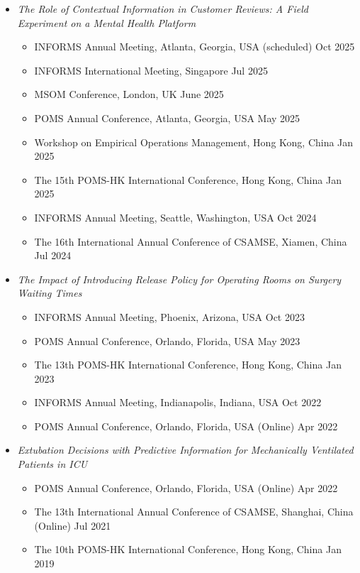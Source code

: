 \documentclass[12pt, a4paper]{article}
\begin{document}
{\begin{itemize}
	\item[] {\it The Role of Contextual Information in Customer Reviews: A Field Experiment on a Mental Health Platform}
	\begin{itemize}
		\item INFORMS Annual Meeting, Atlanta, Georgia, USA (scheduled) \hfill Oct 2025
		\item INFORMS International Meeting, Singapore \hfill Jul 2025
		\item MSOM Conference, London, UK \hfill June 2025
		\item POMS Annual Conference, Atlanta, Georgia, USA \hfill May 2025
		\item Workshop on Empirical Operations Management, Hong Kong, China \hfill Jan 2025
		\item The 15th POMS-HK International Conference, Hong Kong, China \hfill Jan 2025
		\item INFORMS Annual Meeting, Seattle, Washington, USA \hfill Oct 2024
		\item The 16th International Annual Conference of CSAMSE, Xiamen, China \hfill Jul 2024
	\end{itemize}

	\item[] {\it The Impact of Introducing Release Policy for Operating Rooms on Surgery Waiting Times}
	\begin{itemize}
		\item INFORMS Annual Meeting, Phoenix, Arizona, USA \hfill Oct 2023
		\item POMS Annual Conference, Orlando, Florida, USA \hfill May 2023
		\item The 13th POMS-HK International Conference, Hong Kong, China \hfill Jan 2023
		\item INFORMS Annual Meeting, Indianapolis, Indiana, USA \hfill Oct 2022
		\item POMS Annual Conference, Orlando, Florida, USA (Online) \hfill Apr 2022
	\end{itemize}

	\item[] {\it Extubation Decisions with Predictive Information for Mechanically Ventilated Patients in ICU}
	\begin{itemize}
		\item POMS Annual Conference, Orlando, Florida, USA (Online) \hfill Apr 2022
		\item The 13th International Annual Conference of CSAMSE, Shanghai, China (Online) \hfill Jul 2021
		\item The 10th POMS-HK International Conference, Hong Kong, China \hfill Jan 2019
	\end{itemize}


\end{itemize}}
\end{document}
